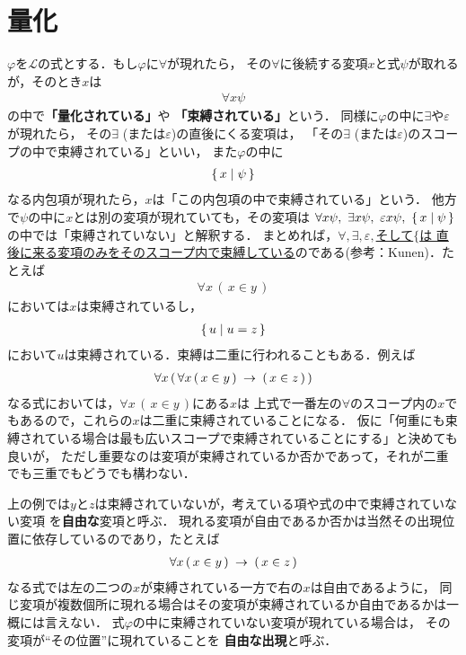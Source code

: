\section{量化}
	$\varphi$を$\mathcal{L}$の式とする．もし$\varphi$に$\forall$が現れたら，
	その$\forall$に後続する変項$x$と式$\psi$が取れるが，そのとき$x$は
	\begin{align}
		\forall x \psi
	\end{align}
	の中で{\bf 「量化されている」}や
	{\bf 「束縛されている」}という．
	同様に$\varphi$の中に$\exists$や$\varepsilon$が現れたら，
	その$\exists$ (または$\varepsilon$)の直後にくる変項は，
	「その$\exists$ (または$\varepsilon$)のスコープの中で束縛されている」といい，
	また$\varphi$の中に
	\begin{align}
		\{\, x \mid \psi\, \}
	\end{align}
	なる内包項が現れたら，$x$は「この内包項の中で束縛されている」という．
	他方で$\psi$の中に$x$とは別の変項が現れていても，その変項は
	$\forall x \psi,\ \exists x \psi,\ \varepsilon x \psi,\ \{\, x \mid \psi\, \}$
	の中では「束縛されていない」と解釈する．
	まとめれば，\underline{$\forall,\exists,\varepsilon,$そして$\{$は
	直後に来る変項のみをそのスコープ内で束縛している}のである(参考：Kunen\cite{Kunen})．たとえば
	\begin{align}
		\forall x\, (\, x \in y\, )
	\end{align}
	においては$x$は束縛されているし，
	\begin{align}
		\{\, u \mid u = z\, \}
	\end{align}
	において$u$は束縛されている．束縛は二重に行われることもある．例えば
	\begin{align}
		\forall x\, (\, \forall x\, (\, x \in y\, ) \hspace{0.25em}\rightarrow\hspace{0.25em} (\, x \in z\, )\, )
	\end{align}
	なる式においては，$\forall x\, (\, x \in y\, )$にある$x$は
	上式で一番左の$\forall$のスコープ内の$x$でもあるので，これらの$x$は二重に束縛されていることになる．
	仮に「何重にも束縛されている場合は最も広いスコープで束縛されていることにする」と決めても良いが，
	ただし重要なのは変項が束縛されているか否かであって，それが二重でも三重でもどうでも構わない．
	
	上の例では$y$と$z$は束縛されていないが，考えている項や式の中で束縛されていない変項
	を{\bf 自由な}変項と呼ぶ．
	現れる変項が自由であるか否かは当然その出現位置に依存しているのであり，たとえば
	\begin{align}
		\forall x\, (\, x \in y\, ) \hspace{0.25em}\rightarrow\hspace{0.25em} (\, x \in z\, )
	\end{align}
	なる式では左の二つの$x$が束縛されている一方で右の$x$は自由であるように，
	同じ変項が複数個所に現れる場合はその変項が束縛されているか自由であるかは一概には言えない．
	式$\varphi$の中に束縛されていない変項が現れている場合は，
	その変項が``その位置''に現れていることを
	{\bf 自由な出現}と呼ぶ．
	
